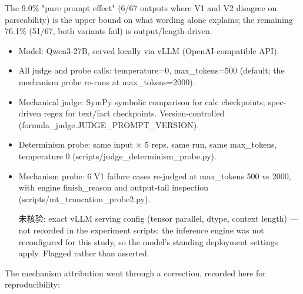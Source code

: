 \documentclass[10pt,twocolumn]{article}
\begin{document}
The 9.0\% "pure prompt effect" (6/67 outputs where V1 and V2 disagree on parseability) is the upper bound on what wording alone explains; the remaining 76.1\% (51/67, both variants fail) is output/length-driven.


\begin{itemize}
  \item Model: Qwen3-27B, served locally via vLLM (OpenAI-compatible API).
  \item All judge and probe calls: temperature=0, max\_tokens=500 (default; the mechanism probe re-runs at max\_tokens=2000).
  \item Mechanical judge: SymPy symbolic comparison for calc checkpoints; spec-driven regex for text/fact checkpoints. Version-controlled (formula\_judge.JUDGE\_PROMPT\_VERSION).
  \item Determinism probe: same input × 5 reps, same run, same max\_tokens, temperature 0 (scripts/judge\_determinism\_probe.py).
  \item Mechanism probe: 6 V1 failure cases re-judged at max\_tokens 500 vs 2000, with engine finish\_reason and output-tail inspection (scripts/mt\_truncation\_probe2.py).
  \item [未核验: exact vLLM serving config (tensor parallel, dtype, context length) — not recorded in the experiment scripts; the inference engine was not reconfigured for this study, so the model's standing deployment settings apply. Flagged rather than asserted.]
\end{itemize}


The mechanism attribution went through a correction, recorded here for reproducibility:
\end{document}
